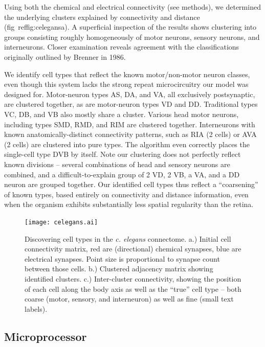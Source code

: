 \documentclass{article}
\begin{document}
Using both the chemical and electrical connectivity (see methods), we
determined the underlying clusters explained by connectivity and
distance (fig~ref{fig:celegans}a). A superficial inspection of the results shows
clustering into groups consisting roughly homogeneously of motor
neurons, sensory neurons, and interneurons. Closer examination reveals
agreement with the classifications originally outlined by Brenner in
1986.  

We identify cell types that reflect the known motor/non-motor neuron
classes, even though this system lacks the strong repeat
microcircuitry our model was designed for.  Motor-neuron types AS, DA,
and VA, all exclusively postsynaptic, are clustered together, as are
motor-neuron types VD and DD. Traditional types VC, DB, and VB also
mostly share a cluster. Various head motor neurons, including types
SMD, RMD, and RIM are clustered together. Interneurons with known
anatomically-distinct connectivity patterns, such as RIA (2 cells) or
AVA (2 cells) are clustered into pure types. The algorithm even
correctly places the single-cell type DVB by itself. Note our
clustering does not perfectly reflect known divisions -- several
combinations of head and sensory neurons are combined, and a
difficult-to-explain group of 2 VD, 2 VB, a VA, and a DD neuron are
grouped together. Our identified cell types thus reflect a
``coarsening'' of known types, based entirely on connectivity and
distance information, even when the organism exhibits substantially
less spatial regularity than the retina. 


\begin{figure}
  \centering 
  \centerline{\texttt{[image: celegans.ai]}}
  \caption{Discovering cell types in the \textit{c. elegans}
    connectome. a.) Initial cell connectivity matrix, red are
    (directional) chemical synapses, blue are electrical
    synapses. Point size is proportional to synapse count between
    those cells. b.) Clustered adjacency matrix showing identified
    clusters. c.) Inter-cluster connectivity, showing the position of
    each cell along the body axis as well as the ``true'' cell type --
    both coarse (motor, sensory, and interneuron) as well as fine
    (small text labels). }
  \label{fig:celegans}
\end{figure}

\subsection{Microprocessor}
\end{document}
